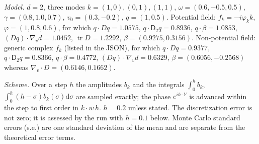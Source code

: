 \documentclass[11pt]{article}
\newcommand{\dd}{\mathrm{d}}
\newcommand{\sD}{\mathsf{D}}
\newcommand{\tr}{\operatorname{tr}}
\theoremstyle{remark}
\begin{document}
\emph{Model.} $d=2$, three modes $k = (1,0),(0,1),(1,1)$,
$\omega = (0.6,-0.5,0.5)$, $\gamma = (0.8,1.0,0.7)$, $v_0 = (0.3,-0.2)$,
$q = (1,0.5)$. Potential field: $f_k = -i\varphi_kk$,
$\varphi = (1,0.8,0.6)$, for which
$q\cdot Dq = 1.0575$, $q\cdot\sD_2q = 0.8936$, $q\cdot\beta = 1.0853$,
$(Dq)\cdot\nabla_vd = 1.0452$, $\tr D = 1.2292$, $\beta = (0.9275,0.3156)$.
Non-potential field: generic complex $f_k$ (listed in the JSON), for which
$q\cdot Dq = 0.9377$, $q\cdot\sD_2q = 0.8366$, $q\cdot\beta = 0.4772$,
$(Dq)\cdot\nabla_vd = 0.6329$, $\beta = (0.6056,-0.2568)$ whereas
$\nabla_v\cdot D = (0.6146,0.1662)$.

\emph{Scheme.} Over a step $h$ the amplitudes $b_k$ and the integrals
$\int_0^hb_k$, $\int_0^h(h-\sigma)b_k(\sigma)\dd\sigma$ are sampled exactly;
the phase $e^{ik\cdot Y}$ is advanced within the step to first order in
$k\cdot w\,h$. $h=0.2$ unless stated. The discretization error is not zero;
it is assessed by the run with $h=0.1$ below. Monte Carlo standard errors
(s.e.) are one standard deviation of the mean and are separate from the
theoretical error terms.
\end{document}

